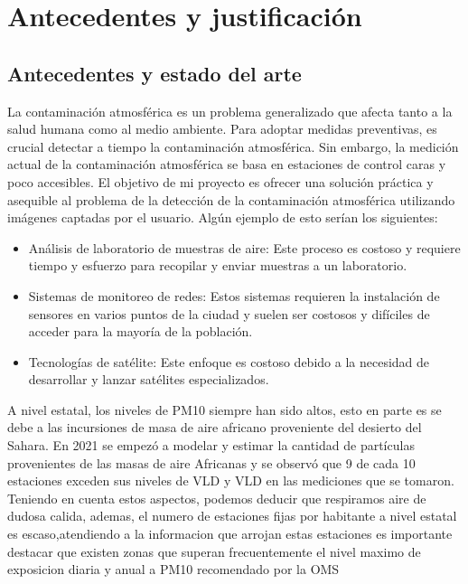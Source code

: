 \chapter{Antecedentes y justificación}\label{Int}
\fancyhf{}%
\fancyfoot[L]{\thepage} 

\section{Antecedentes y estado del arte}

La contaminación atmosférica es un problema generalizado que afecta tanto a la salud humana como al medio ambiente. Para adoptar medidas preventivas, es crucial detectar a tiempo la contaminación atmosférica. Sin embargo, la medición actual de la contaminación atmosférica se basa en estaciones de control caras y poco accesibles. El objetivo de mi proyecto es ofrecer una solución práctica y asequible al problema de la detección de la contaminación atmosférica utilizando imágenes captadas por el usuario. Algún ejemplo de esto serían
los siguientes:
\begin{itemize}
    \item Análisis de laboratorio de muestras de aire: Este proceso es costoso y requiere tiempo y esfuerzo para recopilar y enviar muestras a un laboratorio.
    \item Sistemas de monitoreo de redes:  Estos sistemas requieren la instalación de sensores en varios puntos de la ciudad y suelen ser costosos y difíciles de acceder para la mayoría de la población.
    \item Tecnologías de satélite: Este enfoque es costoso debido a la necesidad de desarrollar y lanzar satélites especializados.
\end{itemize}
A nivel estatal, los niveles de PM10 siempre han sido altos, esto en parte es se debe a las incursiones de masa de aire africano proveniente del desierto del Sahara. En 2021 se empezó a modelar y estimar la cantidad de partículas provenientes de las masas de aire Africanas y se observó que 9 de cada 10 estaciones exceden sus niveles de VLD y VLD en las mediciones que se tomaron.
Teniendo en cuenta estos aspectos, podemos deducir que respiramos aire de dudosa calida, ademas, el numero de estaciones fijas por habitante a nivel estatal es escaso,atendiendo a la informacion que arrojan estas estaciones es importante destacar que existen zonas que superan frecuentemente el nivel maximo de exposicion diaria y anual a PM10 recomendado por la OMS\\
